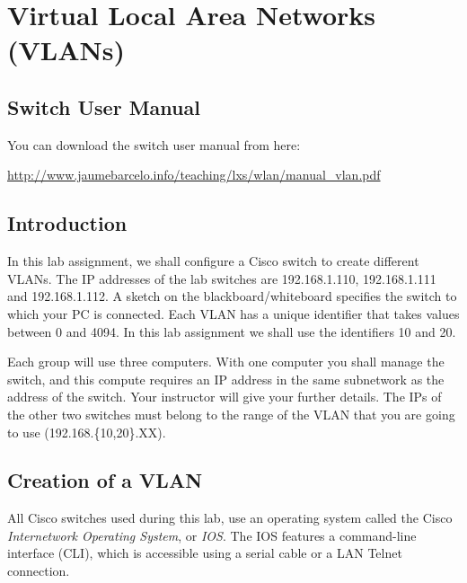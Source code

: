 \chapter{Virtual Local Area Networks (VLANs)}

\section{Switch User Manual}

You can download the switch user manual from here:

\url{http://www.jaumebarcelo.info/teaching/lxs/wlan/manual_vlan.pdf}

\section{Introduction}

In this lab assignment, we shall configure a Cisco switch to create different VLANs. The IP addresses of the lab switches are 192.168.1.110, 192.168.1.111 and 192.168.1.112. A sketch on the blackboard/whiteboard specifies the switch to which your PC is connected. Each VLAN has a unique identifier that takes values between 0 and 4094. In this lab assignment we shall use the identifiers 10 and 20.

Each group will use three computers. With one computer you shall manage the switch, and this compute requires an IP address in the same subnetwork as the address of the switch. Your instructor will give your further details. {\color{red}The IPs of the other two switches must belong to the range of the VLAN that you are going to use (192.168.\{10,20\}.XX).}

\section{Creation of a VLAN}

All Cisco switches used during this lab, use an operating system called the Cisco \emph{Internetwork Operating System}, or \emph{IOS}. The IOS features a command-line interface (CLI), which is accessible using a serial cable or a LAN Telnet connection.


